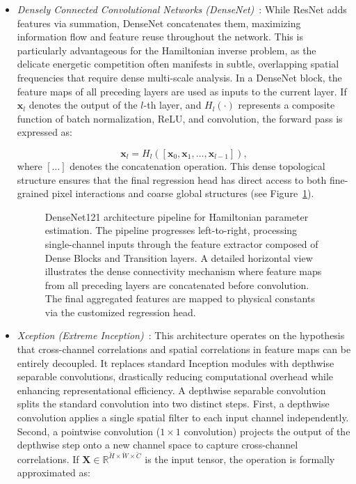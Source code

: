 \documentclass[letterpaper, 12, one column]{article}
\begin{document}
\begin{itemize}
\item[--] \emph{Densely Connected Convolutional Networks (DenseNet)}~\cite{huang2017densely}: While ResNet adds features via summation, DenseNet concatenates them, maximizing information flow and feature reuse throughout the network. This is particularly advantageous for the Hamiltonian inverse problem, as the delicate energetic competition often manifests in subtle, overlapping spatial frequencies that require dense multi-scale analysis. In a DenseNet block, the feature maps of all preceding layers are used as inputs to the current layer. If $\mathbf{x}_l$ denotes the output of the $l$-th layer, and $H_l(\cdot)$ represents a composite function of batch normalization, ReLU, and convolution, the forward pass is expressed as:

\begin{equation}\label{eq:DenseNet}
\mathbf{x}_l = H_l([\mathbf{x}_0, \mathbf{x}_1, \dots, \mathbf{x}_{l-1}]),
\end{equation}
where $[\dots]$ denotes the concatenation operation. This dense topological structure ensures that the final regression head has direct access to both fine-grained pixel interactions and coarse global structures (see Figure~\ref{fig:densenet_implementation}).

\begin{figure}[H]
    \centering
    \resizebox{\linewidth}{!}{
    }
\caption{DenseNet121 architecture pipeline for Hamiltonian parameter estimation. The pipeline progresses left-to-right, processing single-channel inputs through the feature extractor composed of Dense Blocks and Transition layers. A detailed horizontal view illustrates the dense connectivity mechanism where feature maps from all preceding layers are concatenated before convolution. The final aggregated features are mapped to physical constants via the customized regression head.}
\label{fig:densenet_implementation}
\end{figure}


\item[--] \emph{Xception (Extreme Inception)}~\cite{chollet2017xception}: This architecture operates on the hypothesis that cross-channel correlations and spatial correlations in feature maps can be entirely decoupled. It replaces standard Inception modules with depthwise separable convolutions, drastically reducing computational overhead while enhancing representational efficiency. A depthwise separable convolution splits the standard convolution into two distinct steps. First, a depthwise convolution applies a single spatial filter to each input channel independently. Second, a pointwise convolution ($1 \times 1$ convolution) projects the output of the depthwise step onto a new channel space to capture cross-channel correlations. If $\mathbf{X} \in \mathbb{R}^{\breve{H} \times \breve{W} \times \breve{C}}$ is the input tensor, the operation is formally approximated as:


\end{itemize}
\end{document}
